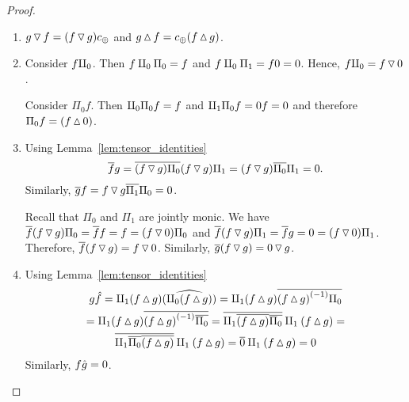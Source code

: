 \begin{proof}
  \prepprooflist
  \begin{enumerate}[{(}i{)}]
    \item $g \tjleft f = (f \tjleft g)\comp $ and $g \tjright f = \comp(f\tjright g)$.
    \item Consider $f \cpa$. Then $f \cpa \Pi_0 = f$ and
      $f \cpa \Pi_1 = f 0 = 0$. Hence, $f \cpa = f \tjleft 0$.

      Consider $\Pi_0 f$. Then $\cpa \Pi_0 f = f$ and
      $\cpb \Pi_0 f = 0 f = 0$ and therefore $\Pi_0 f = (f\tjright 0)$.
    \item Using Lemma~\ref{lem:tensor_identities}
      \[
        \rst{f}g = \rst{(f\tjleft g)\Pi_0} (f\tjleft g)\Pi_1 =
          (f\tjleft g) \rst{\Pi_0} \Pi_1 = 0.
      \]
      Similarly, $\rst{g}f = f\tjleft g \rst{\Pi_1}\Pi_0 = 0$.

      Recall that $\Pi_0$ and $\Pi_1$ are jointly monic. We have
      $\rst{f}(f \tjleft g) \Pi_0 = \rst{f} f = f = (f\tjleft 0) \Pi_0$ and
      $\rst{f}(f \tjleft g) \Pi_1 = \rst{f}g = 0= (f\tjleft 0) \Pi_1$.
      Therefore, $\rst{f}(f \tjleft g) = f \tjleft 0$. Similarly,
      $\rst{g}(f \tjleft g) = 0 \tjleft g$.
    \item Using Lemma~\ref{lem:tensor_identities}
      \begin{multline*}
        g\rg{f} = \cpb(f\tjright g)\wrg{(\cpa(f\tjright g))}  =
          \cpb(f\tjright g) \rst{\inv{(f\tjright g)}\Pi_0} \\
          = \cpb(f\tjright g) \rst{\inv{(f\tjright g)}\rst{\Pi_0}} =
          \rst{\cpb \rst{(f\tjright g)} \rst{\Pi_0}}\cpb(f\tjright g) =\\
          \rst{\cpb \rst{\Pi_0}\rst{(f\tjright g)} }\cpb(f\tjright g) =
          \rst{0}\cpb(f\tjright g) = 0
      \end{multline*}
      Similarly, $f\rg{g} =  0$.


\end{enumerate}
\end{proof}
